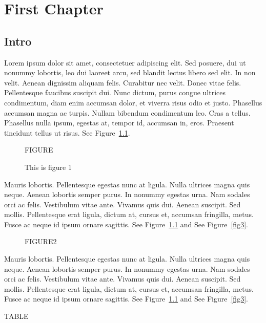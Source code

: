 ﻿\documentclass{report}
\begin{document}
\tableofcontents
\listoffigures
\chapter{First Chapter}

\section{Intro}

Lorem ipsum dolor sit amet, consectetuer adipiscing elit. Sed posuere, dui ut
nonummy lobortis, leo dui laoreet arcu, sed blandit lectus libero sed elit. In
non velit. Aenean dignissim aliquam felis. Curabitur nec velit. Donec vitae
felis. Pellentesque faucibus suscipit dui. Nunc dictum, purus congue ultrices
condimentum, diam enim accumsan dolor, et viverra risus odio et justo. Phasellus
accumsan magna ac turpis. Nullam bibendum condimentum leo. Cras a tellus.
Phasellus nulla ipsum, egestas at, tempor id, accumsan in, eros. Praesent
tincidunt tellus ut risus.  See Figure~\ref{fig1}.

\begin{figure}[h]
\begin{center}
{\Large FIGURE}
\label{fig1}
\caption{This is figure 1}
\end{center}
\end{figure}

Mauris lobortis. Pellentesque egestas nunc at ligula. Nulla ultrices magna quis
neque. Aenean lobortis semper purus. In nonummy egestas urna. Nam sodales orci
ac felis. Vestibulum vitae ante. Vivamus quis dui. Aenean suscipit. Sed mollis.
Pellentesque erat ligula, dictum at, cursus et, accumsan fringilla, metus. Fusce
ac neque id ipsum ornare sagittis.  See Figure~\ref{fig1} and See Figure~\ref{fig3}.

\begin{figure}[ht]
\centering
{\Large FIGURE2}
\end{figure}

Mauris lobortis. Pellentesque egestas nunc at ligula. Nulla ultrices magna quis
neque. Aenean lobortis semper purus. In nonummy egestas urna. Nam sodales orci
ac felis. Vestibulum vitae ante. Vivamus quis dui. Aenean suscipit. Sed mollis.
Pellentesque erat ligula, dictum at, cursus et, accumsan fringilla, metus. Fusce
ac neque id ipsum ornare sagittis.  See Figure~\ref{fig1} and See Figure~\ref{fig3}.

\begin{table}[ht]
\centering
{\Large TABLE}
\end{table}
\end{document}
